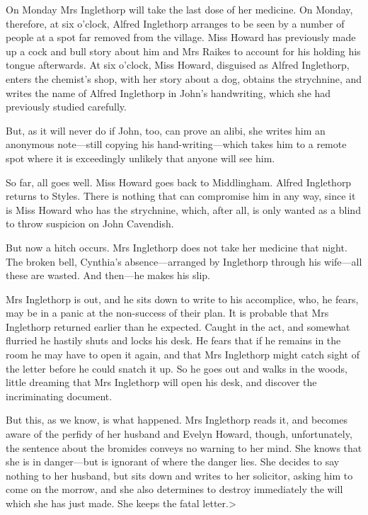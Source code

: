  On Monday Mrs Inglethorp will take the last dose of her medicine. On Monday, therefore, at six o'clock, Alfred Inglethorp arranges to be seen by a number of people at a spot far removed from the village. Miss Howard has previously made up a cock and bull story about him and Mrs Raikes to account for his holding his tongue afterwards. At six o'clock, Miss Howard, disguised as Alfred Inglethorp, enters the chemist's shop, with her story about a dog, obtains the strychnine, and writes the name of Alfred Inglethorp in John's handwriting, which she had previously studied carefully. 

 But, as it will never do if John, too, can prove an alibi, she writes him an anonymous note—still copying his hand-writing—which takes him to a remote spot where it is exceedingly unlikely that anyone will see him. 

 So far, all goes well. Miss Howard goes back to Middlingham. Alfred Inglethorp returns to Styles. There is nothing that can compromise him in any way, since it is Miss Howard who has the strychnine, which, after all, is only wanted as a blind to throw suspicion on John Cavendish. 

 But now a hitch occurs. Mrs Inglethorp does not take her medicine that night. The broken bell, Cynthia's absence—arranged by Inglethorp through his wife—all these are wasted. And then—he makes his slip. 

 Mrs Inglethorp is out, and he sits down to write to his accomplice, who, he fears, may be in a panic at the non-success of their plan. It is probable that Mrs Inglethorp returned earlier than he expected. Caught in the act, and somewhat flurried he hastily shuts and locks his desk. He fears that if he remains in the room he may have to open it again, and that Mrs Inglethorp might catch sight of the letter before he could snatch it up. So he goes out and walks in the woods, little dreaming that Mrs Inglethorp will open his desk, and discover the incriminating document. 

 But this, as we know, is what happened. Mrs Inglethorp reads it, and becomes aware of the perfidy of her husband and Evelyn Howard, though, unfortunately, the sentence about the bromides conveys no warning to her mind. She knows that she is in danger—but is ignorant of where the danger lies. She decides to say nothing to her husband, but sits down and writes to her solicitor, asking him to come on the morrow, and she also determines to destroy immediately the will which she has just made. She keeps the fatal letter.> 

